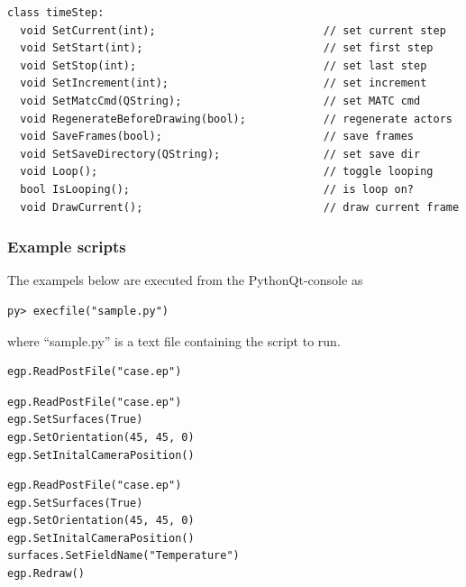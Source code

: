\documentclass[a4paper,12pt]{article}
\begin{document}
\begin{footnotesize}
\begin{verbatim}
class timeStep:
  void SetCurrent(int);                          // set current step
  void SetStart(int);                            // set first step
  void SetStop(int);                             // set last step
  void SetIncrement(int);                        // set increment
  void SetMatcCmd(QString);                      // set MATC cmd
  void RegenerateBeforeDrawing(bool);            // regenerate actors
  void SaveFrames(bool);                         // save frames
  void SetSaveDirectory(QString);                // set save dir
  void Loop();                                   // toggle looping
  bool IsLooping();                              // is loop on?
  void DrawCurrent();                            // draw current frame
\end{verbatim}
\end{footnotesize}

\subsubsection{Example scripts}

The exampels below are executed from the PythonQt-console as
\begin{footnotesize}
\begin{verbatim}
py> execfile("sample.py")
\end{verbatim}
\end{footnotesize}
where ``sample.py'' is a text file containing the script to run.

\vskip5mm
\begin{footnotesize}
\begin{verbatim}
egp.ReadPostFile("case.ep")
\end{verbatim}
\end{footnotesize}

\vskip5mm
\begin{footnotesize}
\begin{verbatim}
egp.ReadPostFile("case.ep")
egp.SetSurfaces(True)
egp.SetOrientation(45, 45, 0)
egp.SetInitalCameraPosition()
\end{verbatim}
\end{footnotesize}

\vskip5mm
\begin{footnotesize}
\begin{verbatim}
egp.ReadPostFile("case.ep")
egp.SetSurfaces(True)
egp.SetOrientation(45, 45, 0)
egp.SetInitalCameraPosition()
surfaces.SetFieldName("Temperature")
egp.Redraw()
\end{verbatim}
\end{footnotesize}
\end{document}
